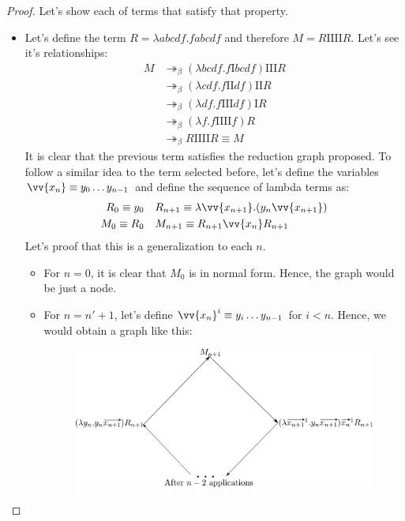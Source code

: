 \documentclass[11pt]{article}
\theoremstyle{definition}
\theoremstyle{remark}
\theoremstyle{remark}
\theoremstyle{definition}
\newcommand{\I}{\pmb{\mathrm{I}}}
\begin{document}
\begin{proof}
  Let's show each of terms that satisfy that property.
  \begin{itemize}
    \item Let's define the term $R = \lambda abcdf. fabcdf$ and therefore
          $M = R\I\I\I\I R$. Let's see it's relationships:
          \begin{align*}
            M &\twoheadrightarrow_\beta (\lambda bcdf. f\I bcdf)\I\I\I R \\
              &\twoheadrightarrow_\beta (\lambda cdf. f\I\I df)\I\I R \\
              &\twoheadrightarrow_\beta (\lambda df. f\I\I\I df)\I R \\
              &\twoheadrightarrow_\beta (\lambda f. f\I\I\I\I f) R \\
              &\twoheadrightarrow_\beta R\I\I\I\I R \equiv M
          \end{align*}
          It is clear that the previous term satisfies the reduction graph
          proposed. To follow a similar idea to the term selected before, let's
          define the variables $\vv{x_n} \equiv y_0 \ldots y_{n-1}$ and define
          the sequence of lambda terms as:
          \begin{align*}
            R_0 \equiv y_0 &\quad R_{n+1} \equiv \lambda \vv{x_{n+1}}. (y_{n} \vv{x_{n+1}}) \\
            M_0 \equiv R_0 &\quad M_{n+1} \equiv R_{n+1} \vv{x_n} R_{n+1}
          \end{align*}
          Let's proof that this is a generalization to each $n$.
          \begin{itemize}
            \item For $n = 0$, it is clear that $M_0$ is in normal form. Hence,
                  the graph would be just a node.
            \item For $n = n' + 1$, let's define
                  $\vv{x_n}^i \equiv y_i \ldots y_{n-1}$ for $i < n$. Hence, we
                  would obtain a graph like this:
                  \begin{figure}[H]
                    \centering
                    \includegraphics[scale=0.5]{../graphs/exercise-3-5-2-i-n.pdf}
                  \end{figure}
          \end{itemize}


\end{itemize}
\end{proof}
\end{document}
